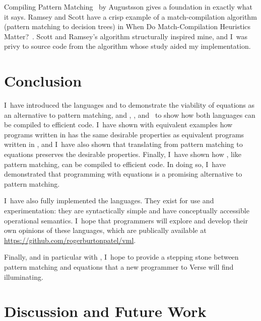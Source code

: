 \documentclass[manuscript,screen,review, 12pt, nonacm]{acmart}
\begin{document}
    Compiling Pattern Matching~\citep{augustsson1985compiling} by Augustsson
    gives a foundation in exactly what it says. Ramsey and Scott have a crisp
    example of a match-compilation algorithm (pattern matching to decision
    trees) in When Do Match-Compilation Heuristics Matter?~\citep{scottramsey}.
    Scott and Ramsey's algorithm structurally inspired mine, and I~was privy to
    source code from the algorithm whose study aided my implementation. 
    
    
    \section{Conclusion}

    I~have introduced the languages \PPlus and \VMinus to demonstrate the
    viability of equations as an alternative to pattern matching, and \D,
    \PtoVTran, and \DTran\ to show how both languages can be compiled to
    efficient code. I~have shown with equivalent examples how programs written
    in \VMinus has the same desirable properties as equivalent programs written
    in \PPlus, and I~have also shown that translating from pattern matching to
    equations preserves the desirable properties. Finally, I~have shown how
    \VMinus, like pattern matching, can be compiled to efficient code. In doing
    so, I~have demonstrated that programming with equations is a promising
    alternative to pattern matching. 

    I~have also fully implemented the languages. They exist for use and
    experimentation: they are syntactically simple and have conceptually
    accessible operational semantics. I~hope that programmers will explore and
    develop their own opinions of these languages, which are publically
    available at \url{https://github.com/rogerburtonpatel/vml}. 

    Finally, and in particular with \VMinus, I~hope to provide a stepping stone
    between pattern matching and equations that a new programmer to Verse will
    find illuminating. 
    
    
    \section{Discussion and Future Work}        
    \label{futurework}
    
\end{document}

